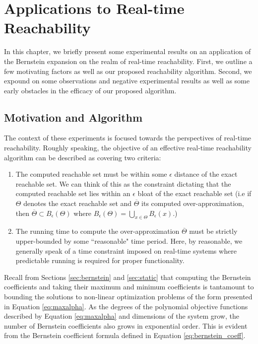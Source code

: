 \newcommand{\barb}{\overline{b}}

\newcommand{\ComputeBern}{\texttt{ComputeBernsteinCoeffIntervals}}
\newcommand{\FindOverlaps}{\texttt{FindOverlapsWithGrid}}
\newcommand{\ComputeGridRep}{\texttt{ComputeGridGeneratorRep}}



\chapter{Applications to Real-time Reachability}
%
In this chapter, we briefly present some experimental results on an application of the Bernstein expansion on the realm of real-time reachability. First, we outline a few motivating factors as well as our proposed reachability algorithm. Second, we expound on some observations and negative experimental results as well as some early obstacles in the efficacy of our proposed algorithm.
%
\section{Motivation and Algorithm}
The context of these experiments is focused towards the perspectives of real-time reachability. Roughly speaking, the objective of an effective real-time reachability algorithm can be described as covering two criteria:
%
\begin{enumerate}
  \item The computed reachable set must be within some $\epsilon$ distance of the exact reachable set. We can think of this as the constraint dictating that the computed reachable set lies within an $\epsilon$ bloat of the exact reachable set (i.e if $\Theta$ denotes the exact reachable set and $\overline{\Theta}$ its computed over-approximation, then
    $ \overline{\Theta} \subset B_\epsilon(\Theta)$
    where
    $B_\epsilon(\Theta) = \bigcup_{x \in \Theta} B_{\epsilon}(x)$.)
  \item The running time to compute the over-approximation $\overline{\Theta}$ must be strictly upper-bounded by some ``reasonable" time period. Here, by reasonable, we generally speak of a time constraint imposed on real-time systems where predictable running is required for proper functionality.
\end{enumerate}

Recall from Sections \ref{sec:bernstein} and \ref{sec:static} that computing the Bernstein coefficients and taking their maximum and minimum coefficients is tantamount to bounding the solutions to non-linear optimization problems of the form presented in Equation \ref{eq:maxalpha}. As the degrees of the polynomial objective functions described by Equation \ref{eq:maxalpha} and dimensions of the system grow, the number of Bernstein coefficients also grows in exponential order. This is evident from the Bernstein coefficient formula defined in Equation \ref{eq:bernstein_coeff}.

